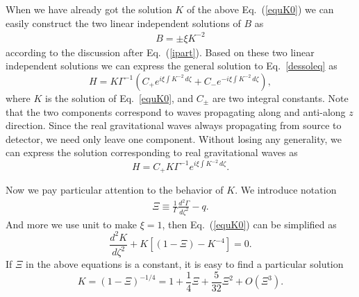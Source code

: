 \documentclass[prd,aps,a4paper,superscriptaddress,onecolumn,nofootinbib]{revtex4}
\begin{document}
When we have already got the solution $K$ of the above Eq.~(\ref{equK0}) we can easily construct the two linear independent solutions of $B$ as
\begin{align}
B=\pm\xi K^{-2}
\end{align}
according to the discussion after Eq.~(\ref{ipart}). Based on these two linear independent solutions we can express the general solution to Eq.~\eqref{dessoleq} as
\begin{equation}
    H=K\Gamma^{-1}\left(C_+e^{i\xi\int  K^{-2}\,d\zeta}+C_-e^{-i\xi\int  K^{-2}\,d\zeta}\right),
\end{equation}
where $K$ is the solution of Eq.~\eqref{equK0}, and $C_{\pm}$ are two integral constants. Note that the two components correspond to waves propagating along and anti-along $z$ direction. Since the real gravitational waves always propagating from source to detector, we need only leave one component. Without losing any generality, we can express the solution corresponding to real gravitational waves as
\begin{equation}
    H=C_+K\Gamma^{-1}e^{i\xi\int  K^{-2}\,d\zeta}.
\end{equation}

Now we pay particular attention to the behavior of $K$. We introduce notation
\begin{align}
\Xi\equiv\frac{1}{\Gamma}\frac{d^2\Gamma}{d\zeta^2}-q.
\end{align}
And more we use unit to make $\xi=1$, then Eq.~(\ref{equK0}) can be simplified as
\begin{equation}\label{equK}
    \frac{d^2 K}{d\zeta^2}+K[(1-\Xi)-K^{-4}]=0.
\end{equation}
If $\Xi$ in the above equations is a constant, it is easy to find a particular solution
\begin{equation}\label{K0}
    K=(1-\Xi)^{-1/4}=1+\frac{1}{4}\Xi+\frac{5}{32}\Xi^2+O(\Xi^3).
\end{equation}
\end{document}
